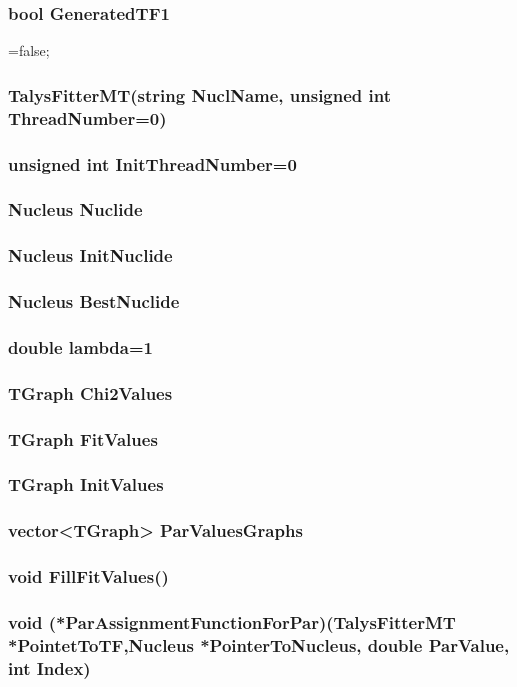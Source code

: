 \documentclass[a4paper,12pt]{extarticle}
\begin{document}
\subsubsection{bool GeneratedTF1}
=false;
\subsubsection{TalysFitterMT(string NuclName, unsigned int ThreadNumber=0)}
\subsubsection{unsigned int InitThreadNumber=0}
\subsubsection{Nucleus Nuclide}
\subsubsection{Nucleus InitNuclide}
\subsubsection{Nucleus BestNuclide}
\subsubsection{double lambda=1}
\subsubsection{TGraph Chi2Values}
\subsubsection{TGraph FitValues}
\subsubsection{TGraph InitValues}
\subsubsection{vector<TGraph> ParValuesGraphs}
\subsubsection{void FillFitValues()}
\subsubsection{void (*ParAssignmentFunctionForPar)(TalysFitterMT *PointetToTF,Nucleus *PointerToNucleus, double ParValue, int Index)}
\end{document}
